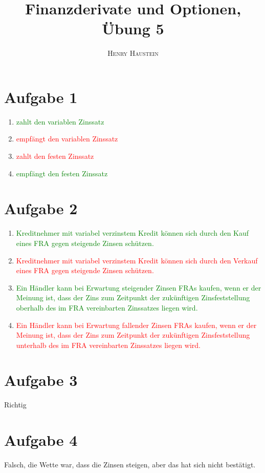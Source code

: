 \documentclass{article}
\title{\textbf{Finanzderivate und Optionen, Übung 5}}
\author{\textsc{Henry Haustein}}
\date{}
\begin{document}
	\maketitle
	
	\section*{Aufgabe 1}
	\begin{enumerate}[label=(\alph*)]
		\item\textcolor{green}{zahlt den variablen Zinssatz}
		\item\textcolor{red}{empfängt den variablen Zinssatz}
		\item\textcolor{red}{zahlt den festen Zinssatz}
		\item\textcolor{green}{empfängt den festen Zinssatz}
	\end{enumerate}

	\section*{Aufgabe 2}
	\begin{enumerate}[label=(\alph*)]
		\item \textcolor{green}{Kreditnehmer mit variabel verzinstem Kredit können sich durch den Kauf eines FRA gegen steigende Zinsen schützen.}
		\item \textcolor{red}{Kreditnehmer mit variabel verzinstem Kredit können sich durch den Verkauf eines FRA gegen steigende Zinsen schützen.}
		\item \textcolor{green}{Ein Händler kann bei Erwartung steigender Zinsen FRAs kaufen, wenn er der Meinung ist, dass der Zins zum Zeitpunkt der zukünftigen Zinsfeststellung oberhalb des im FRA vereinbarten Zinssatzes liegen wird.}
		\item \textcolor{red}{Ein Händler kann bei Erwartung fallender Zinsen FRAs kaufen, wenn er der Meinung ist, dass der Zins zum Zeitpunkt der zukünftigen Zinsfeststellung unterhalb des im FRA vereinbarten Zinssatzes liegen wird.}
	\end{enumerate}
	
	\section*{Aufgabe 3}
	Richtig
	
	\section*{Aufgabe 4}
	Falsch, die Wette war, dass die Zinsen steigen, aber das hat sich nicht bestätigt.
	
\end{document}
